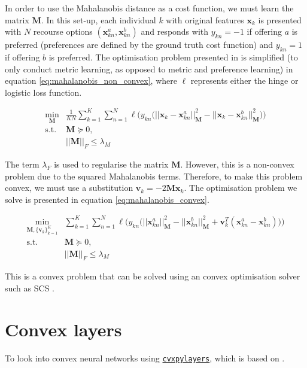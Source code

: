 In order to use the Mahalanobis distance as a cost function, we must learn the matrix $\mathbf{M}$. In this set-up, each individual $k$ with original features $\mathbf{x}_k$ is presented with $N$ recourse options $(\mathbf{x}_{kn}^a, \mathbf{x}_{kn}^b)$ and responds with $y_{kn}=-1$ if offering $a$ is preferred (preferences are defined by the ground truth cost function) and $y_{kn}=1$ if offering $b$ is preferred. The optimisation problem presented in \textcite{canalOneAllSimultaneous2022} is simplified (to only conduct metric learning, as opposed to metric and preference learning) in equation \ref{eq:mahalanobis_non_convex}, where $\ell$ represents either the hinge or logistic loss function.

\begin{align} \label{eq:mahalanobis_non_convex}
	\min_{\mathbf{M}} & \frac{1}{KN} \sum_{k=1}^K \sum_{n=1}^N \ell \bigg( y_{kn} \big(|| \mathbf{x}_k - \mathbf{x}_{kn}^a ||^2_{\mathbf{M}} - || \mathbf{x}_k - \mathbf{x}_{kn}^b ||^2_{\mathbf{M}} \big) \bigg) \\	
	\text{s.t. } & \mathbf{M} \succeq 0, \nonumber \\
	& ||\mathbf{M}||_F \leq \lambda_M \nonumber
\end{align}

The term $\lambda_F$ is used to regularise the matrix $\mathbf{M}$. However, this is a non-convex problem due to the squared Mahalanobis terms. Therefore, to make this problem convex, we must use a substitution $\mathbf{v}_k = -2\mathbf{Mx}_k$. The optimisation problem we solve is presented in equation \ref{eq:mahalanobis_convex}.

\begin{align} \label{eq:mahalanobis_convex}
	\min_{\mathbf{M}, \{ \mathbf{v}_k\}^K_{k=1}} &  \sum_{k=1}^K \sum_{n=1}^N \ell \bigg( y_{kn} \big(||\mathbf{x}_{kn}^a ||^2_{\mathbf{M}} - ||\mathbf{x}_{kn}^b ||^2_{\mathbf{M}} + \mathbf{v}_k^T (\mathbf{x}_{kn}^a - \mathbf{x}_{kn}^b) \big) \bigg) \\
	\text{s.t. } & \mathbf{M} \succeq 0, \nonumber \\
	& ||\mathbf{M}||_F \leq \lambda_M \nonumber
\end{align}


This is a convex problem that can be solved using an convex optimisation solver such as SCS \citep{odonoghueOperatorSplittingHomogeneous2021}.



\section{Convex layers}

To look into convex neural networks using \href{https://github.com/cvxgrp/cvxpylayers}{\texttt{cvxpylayers}}, which is based on \textcite{agrawalDifferentiableConvexOptimization2019}.
